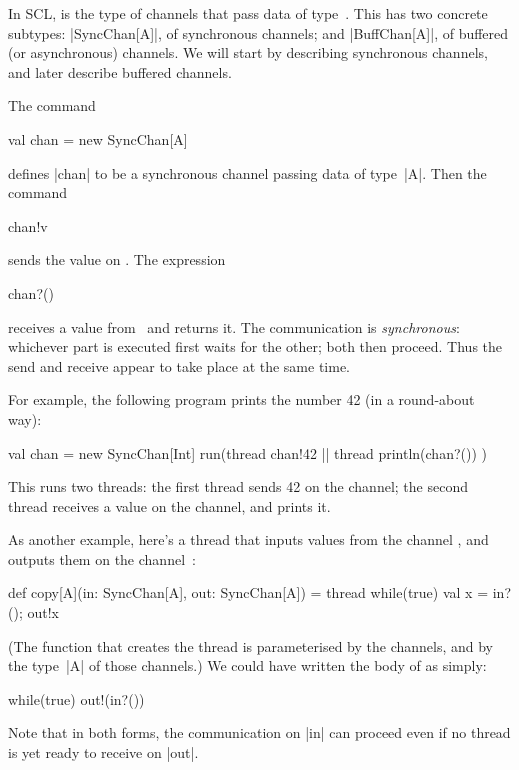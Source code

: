 

In SCL,  is the type of channels that pass data of
type~.  This has two concrete subtypes: |SyncChan[A]|, of synchronous
channels; and |BuffChan[A]|, of buffered (or asynchronous) channels.  We will
start by describing synchronous channels, and later describe buffered
channels. 

The command
\begin{scala}
  val chan = new SyncChan[A]
\end{scala}
defines |chan| to be a synchronous channel passing data of type~|A|.  Then the
command 
\begin{scala}
  chan!v
\end{scala}
sends the value  on .  The expression
\begin{scala}
  chan?()
\end{scala}
receives a value from~ and returns it.  The communication is
\emph{synchronous}: whichever part is executed first waits for the other; both
then proceed.  Thus the send and receive appear to take place at the same
time.  


For example, the following program prints the number 42 (in a round-about
way): 
\begin{scala}
  val chan = new SyncChan[Int]
  run(thread{ chan!42 } || thread{ println(chan?()) }) 
\end{scala}
%
This runs two threads: the first thread sends 42 on the channel; the second
thread receives a value on the channel, and prints it.


As another example, here's a thread that inputs values from the channel
, and outputs them on the channel~:
%
\begin{scala}
def copy[A](in: SyncChan[A], out: SyncChan[A]) = thread{
  while(true){ val x = in?(); out!x }
}
\end{scala}
%
(The function that creates the thread is parameterised by the channels, and by
the type~|A| of those channels.)
%
We could have written the body of  as simply:
\begin{scala}
  while(true) out!(in?()) 
\end{scala}
Note that in both forms, the communication on |in| can proceed even if no
thread is yet ready to receive on |out|.

